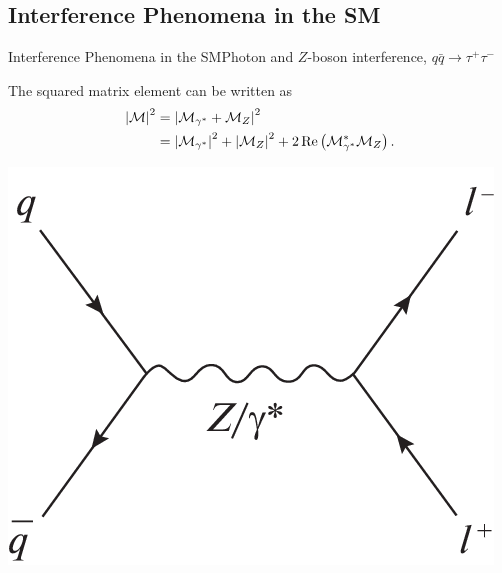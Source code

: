 \documentclass{../bredelebeamer}
\begin{document}
\subsection{Interference Phenomena in the SM}
\begin{frame}{Interference Phenomena in the SM}{Photon and $Z$-boson interference, $q \bar q \longrightarrow \tau^+ \tau^- $}
    
    \begin{minipage}{0.65\textwidth}
        The squared matrix element can be written as
        \begin{equation}
            \begin{aligned}
                \abs{\mathcal{M}}^2 & =\abs{\mathcal{M}_{\gamma^*}+\mathcal{M}_{Z}}^2
                \\&= \abs{\mathcal{M}_{\gamma^*}}^2 + \abs{\mathcal{M}_{Z}}^2 + 2\Re\left( \mathcal{M}_{\gamma^*}^*\mathcal{M}_{Z} \right).    \notag
            \end{aligned}
        \end{equation}
    \end{minipage}
    \hfill
    \begin{minipage}{0.33\textwidth}
        \begin{center}
            \includegraphics[width=.8\linewidth]{DY.png}
        \end{center}
    \end{minipage}
    \pause
    $ $\\$ $\\$ $


\end{frame}
\end{document}
